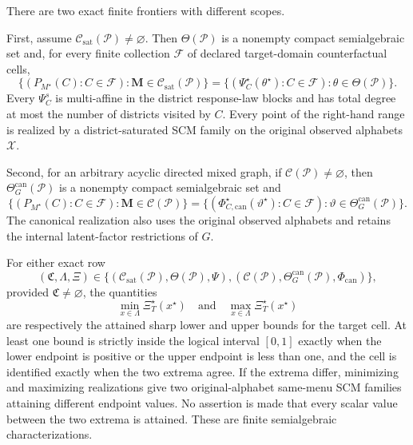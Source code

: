 There are two exact finite frontiers with different scopes.

First, assume \(\mathcal C_{\mathrm{sat}}(\mathcal P)\ne\varnothing\). Then \(\Theta(\mathcal P)\) is a nonempty compact semialgebraic set and, for every finite collection \(\mathcal F\) of declared target-domain counterfactual cells,
\[
\{(P_{M^\star}(C):C\in\mathcal F):\mathbf M\in\mathcal C_{\mathrm{sat}}(\mathcal P)\}
=
\{(\Psi_C^\star(\theta^\star):C\in\mathcal F):\theta\in\Theta(\mathcal P)\}.
\]
Every \(\Psi_C^s\) is multi-affine in the district response-law blocks and has total degree at most the number of districts visited by \(C\). Every point of the right-hand range is realized by a district-saturated SCM family on the original observed alphabets \(\mathcal X\).

Second, for an arbitrary acyclic directed mixed graph, if \(\mathcal C(\mathcal P)\ne\varnothing\), then \(\Theta_G^{\mathrm{can}}(\mathcal P)\) is a nonempty compact semialgebraic set and
\[
\{(P_{M^\star}(C):C\in\mathcal F):\mathbf M\in\mathcal C(\mathcal P)\}
=
\{(\Phi_{C,\mathrm{can}}^\star(\vartheta^\star):C\in\mathcal F):
\vartheta\in\Theta_G^{\mathrm{can}}(\mathcal P)\}.
\]
The canonical realization also uses the original observed alphabets and retains the internal latent-factor restrictions of \(G\).

For either exact row
\[
(\mathfrak C,\Lambda,\Xi)
\in
\{(\mathcal C_{\mathrm{sat}}(\mathcal P),\Theta(\mathcal P),\Psi),
(\mathcal C(\mathcal P),\Theta_G^{\mathrm{can}}(\mathcal P),\Phi_{\mathrm{can}})\},
\]
provided \(\mathfrak C\ne\varnothing\), the quantities
\[
\min_{x\in\Lambda}\Xi_T^\star(x^\star)
\quad\text{and}\quad
\max_{x\in\Lambda}\Xi_T^\star(x^\star)
\]
are respectively the attained sharp lower and upper bounds for the target cell. At least one bound is strictly inside the logical interval \([0,1]\) exactly when the lower endpoint is positive or the upper endpoint is less than one, and the cell is identified exactly when the two extrema agree. If the extrema differ, minimizing and maximizing realizations give two original-alphabet same-menu SCM families attaining different endpoint values. No assertion is made that every scalar value between the two extrema is attained. These are finite semialgebraic characterizations.

